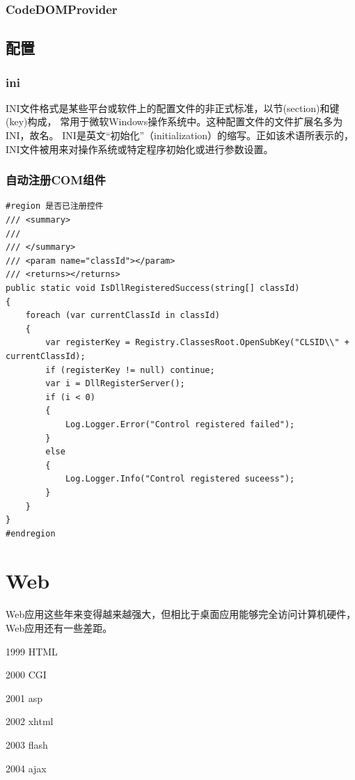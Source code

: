 \documentclass{book}
\begin{document}
\subsection{CodeDOMProvider}

\section{配置}

\subsection{ini}

INI文件格式是某些平台或软件上的配置文件的非正式标准，以节(section)和键(key)构成，
常用于微软Windows操作系统中。这种配置文件的文件扩展名多为INI，故名。
INI是英文“初始化”（initialization）的缩写。正如该术语所表示的，
INI文件被用来对操作系统或特定程序初始化或进行参数设置。

\subsection{自动注册COM组件}

\begin{lstlisting}[language={[Sharp]C}]
#region 是否已注册控件
/// <summary>
/// 
/// </summary>
/// <param name="classId"></param>
/// <returns></returns>
public static void IsDllRegisteredSuccess(string[] classId)
{
	foreach (var currentClassId in classId)
	{
		var registerKey = Registry.ClassesRoot.OpenSubKey("CLSID\\" + currentClassId);
		if (registerKey != null) continue;
		var i = DllRegisterServer();
		if (i < 0)
		{
			Log.Logger.Error("Control registered failed");
		}
		else
		{
			Log.Logger.Info("Control registered suceess");
		}
	}
}
#endregion
\end{lstlisting}

\chapter{Web}

Web应用这些年来变得越来越强大，但相比于桌面应用能够完全访问计算机硬件，Web应用还有一些差距。

1999 HTML

2000 CGI

2001 asp

2002 xhtml

2003 flash

2004 ajax
\end{document}
